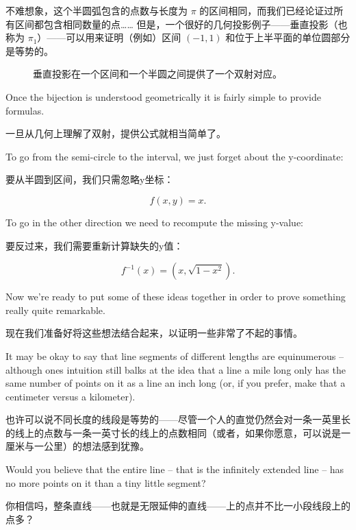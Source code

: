 不难想象，这个半圆弧包含的点数与长度为 $\pi$ 的区间相同，而我们已经论证过所有区间都包含相同数量的点…… 但是，一个很好的几何投影例子——垂直投影（也称为 $\pi_1$）——可以用来证明（例如）区间 $(-1, 1)$ 和位于上半平面的单位圆部分是等势的。

\begin{figure}[!hbtp]
    
    \caption[An interval is equivalent to a semi-circle.]{Vertical projection %
        provides a bijective correspondence between an interval and a semi-circle.
    }
    \caption[一个区间等价于一个半圆。]{垂直投影在一个区间和一个半圆之间提供了一个双射对应。
    }
    \label{fig:interval_n_semicircle}
\end{figure}

Once the bijection is understood geometrically it is fairly simple to provide
formulas.

一旦从几何上理解了双射，提供公式就相当简单了。

To go from the semi-circle to the interval, we just forget
about the y-coordinate:

要从半圆到区间，我们只需忽略y坐标：

\[ f(x, y) = x.
\]

To go in the other direction we need to recompute the missing y-value:

要反过来，我们需要重新计算缺失的y值：

\[ f^{-1}(x) = (x, \sqrt{1 - x^2}).\]

Now we're ready to put some of these ideas together in order to prove
something really quite remarkable.

现在我们准备好将这些想法结合起来，以证明一些非常了不起的事情。

It may be okay to say that line segments
of different lengths are equinumerous -- although ones intuition still balks
at the idea that a line a mile long only has the same number of points on
it as a line an inch long (or, if you prefer, make that a centimeter versus
a kilometer).

也许可以说不同长度的线段是等势的——尽管一个人的直觉仍然会对一条一英里长的线上的点数与一条一英寸长的线上的点数相同（或者，如果你愿意，可以说是一厘米与一公里）的想法感到犹豫。

Would you believe that the entire line -- that is the infinitely
extended line -- has no more points on it than a tiny little segment?

你相信吗，整条直线——也就是无限延伸的直线——上的点并不比一小段线段上的点多？

